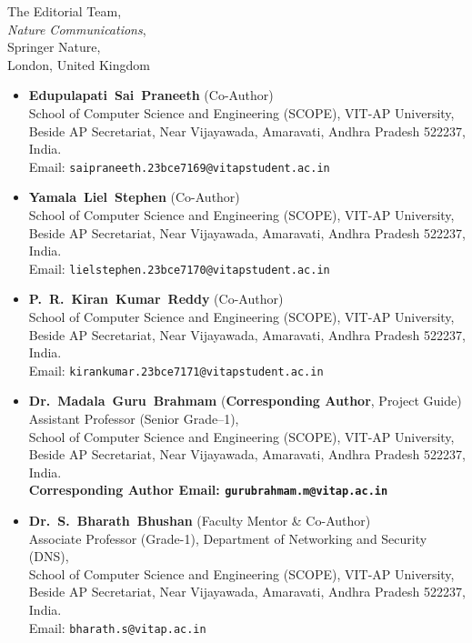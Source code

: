 \documentclass[11pt]{letter}
\begin{document}
\begin{letter}{%
    The Editorial Team,\\
    \textit{Nature Communications},\\
    Springer Nature,\\
    London, United Kingdom
}
\begin{itemize}
    \item \textbf{Edupulapati~Sai~Praneeth} (Co-Author)\\
    School of Computer Science and Engineering (SCOPE), VIT-AP University,\\
    Beside AP Secretariat, Near Vijayawada, Amaravati, Andhra Pradesh 522237, India.\\
    Email: \texttt{saipraneeth.23bce7169@vitapstudent.ac.in}
    
    \item \textbf{Yamala~Liel~Stephen} (Co-Author)\\
    School of Computer Science and Engineering (SCOPE), VIT-AP University,\\
    Beside AP Secretariat, Near Vijayawada, Amaravati, Andhra Pradesh 522237, India.\\
    Email: \texttt{lielstephen.23bce7170@vitapstudent.ac.in}
    
    \item \textbf{P.~R.~Kiran~Kumar~Reddy} (Co-Author)\\
    School of Computer Science and Engineering (SCOPE), VIT-AP University,\\
    Beside AP Secretariat, Near Vijayawada, Amaravati, Andhra Pradesh 522237, India.\\
    Email: \texttt{kirankumar.23bce7171@vitapstudent.ac.in}
    
    \item \textbf{Dr.~Madala~Guru~Brahmam} (\textbf{Corresponding Author}, Project Guide)\\
    Assistant Professor (Senior Grade--1),\\
    School of Computer Science and Engineering (SCOPE), VIT-AP University,\\
    Beside AP Secretariat, Near Vijayawada, Amaravati, Andhra Pradesh 522237, India.\\
    \textbf{Corresponding Author Email: \texttt{gurubrahmam.m@vitap.ac.in}}
    
    \item \textbf{Dr.~S.~Bharath~Bhushan} (Faculty Mentor \& Co-Author)\\
    Associate Professor (Grade-1), Department of Networking and Security (DNS),\\
    School of Computer Science and Engineering (SCOPE), VIT-AP University,\\
    Beside AP Secretariat, Near Vijayawada, Amaravati, Andhra Pradesh 522237, India.\\
    Email: \texttt{bharath.s@vitap.ac.in}
    

\end{itemize}
\end{letter}
\end{document}

